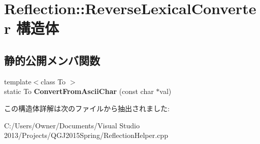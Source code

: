 \hypertarget{struct_reflection_1_1_reverse_lexical_converter}{}\section{Reflection\+:\+:Reverse\+Lexical\+Converter 構造体}
\label{struct_reflection_1_1_reverse_lexical_converter}
\subsection*{静的公開メンバ関数}
\begin{DoxyCompactItemize}
\item 
{\footnotesize template$<$class To $>$ }\\static To {\bfseries Convert\+From\+Ascii\+Char} (const char $\ast$val)\hypertarget{struct_reflection_1_1_reverse_lexical_converter_a246f9c0fe7eb32bb24c8c09311c03bb8}{}\label{struct_reflection_1_1_reverse_lexical_converter_a246f9c0fe7eb32bb24c8c09311c03bb8}

\end{DoxyCompactItemize}


この構造体詳解は次のファイルから抽出されました\+:\begin{DoxyCompactItemize}
\item 
C\+:/\+Users/\+Owner/\+Documents/\+Visual Studio 2013/\+Projects/\+Q\+G\+J2015\+Spring/Reflection\+Helper.\+cpp\end{DoxyCompactItemize}
